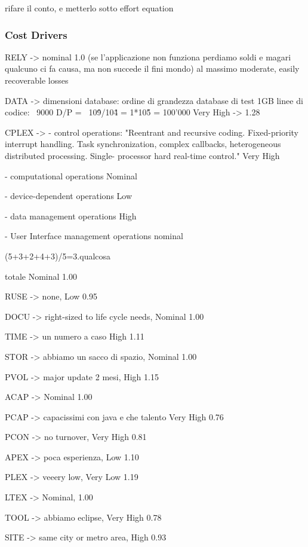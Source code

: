 \documentclass[english]{article}
\begin{document}

rifare il conto, e metterlo sotto effort equation

\subsubsection{Cost Drivers}

RELY -> nominal 1.0 (se l'applicazione non funziona perdiamo soldi e magari qualcuno ci fa causa, ma non succede il fini mondo) al massimo moderate, easily recoverable losses

DATA ->  
dimensioni database: ordine di grandezza database di test 1GB %
linee di codice: ~9000
D/P = ~10\^9/10\^4 = 1*10\^5 = 100'000
Very High -> 1.28

CPLEX ->
- control operations:
"Reentrant and recursive coding. Fixed-priority interrupt
handling. Task
synchronization,
complex
callbacks,
heterogeneous
distributed
processing.
Single-
processor hard
real-time control."
Very High

- computational operations
Nominal

- device-dependent operations
Low

- data management operations
High

- User Interface management operations
nominal

(5+3+2+4+3)/5=3.qualcosa

totale Nominal 1.00

RUSE -> none, Low 0.95

DOCU -> right-sized to life cycle needs, Nominal 1.00

TIME -> un numero a caso High 1.11

STOR -> abbiamo un sacco di spazio, Nominal 1.00

PVOL -> major update 2 mesi, High 1.15

ACAP -> Nominal 1.00

PCAP -> capacissimi con java e che talento Very High 0.76

PCON -> no turnover, Very High 0.81

APEX -> poca esperienza, Low 1.10

PLEX -> veeery low, Very Low 1.19

LTEX -> Nominal, 1.00

TOOL -> abbiamo eclipse, Very High 0.78

SITE -> same city or metro area, High 0.93
\end{document}
